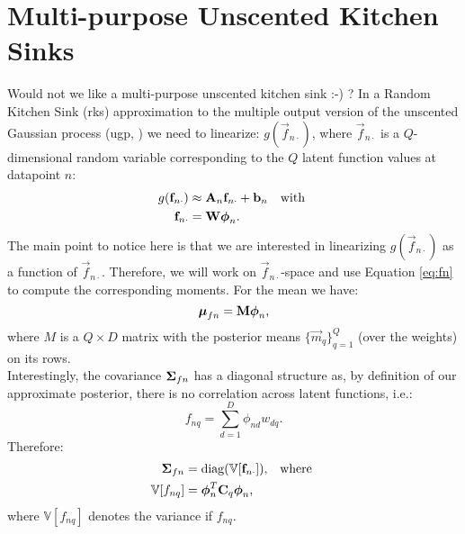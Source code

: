 \documentclass[11pt,a4paper]{article}
\newcommand{\rks}{{\sc rks}\xspace}
\newcommand{\ugp}{{\sc ugp}\xspace}
\newcommand{\m}{\vec{m}}
\renewcommand{\Q}{Q}
\newcommand{\f}{\vec{f}}
\newcommand{\fn}{\f_{n \cdot}}
\newcommand{\An}{\mat{A}_n}
\newcommand{\bn}{\vec{b}_n}
\renewcommand{\W}{\mat{W}}
\newcommand{\phin}{\vecS{\phi}_n}
\newcommand{\mufn}{\vecS{\mu}_{fn}}
\newcommand{\Sigmafn}{\mat{\Sigma}_{fn}}
\newcommand{\M}{\mat{M}}
\renewcommand{\D}{D}
\newcommand{\fnq}{f_{nq}}
\newcommand{\var}[1]{\mathbb{V}[#1]}
\begin{document}
%
\section{Multi-purpose Unscented Kitchen Sinks}
Would not we like a multi-purpose unscented kitchen sink :-) ? In a Random Kitchen Sink (\rks)
approximation to the multiple output version of the unscented Gaussian process (\ugp, ) we need to linearize: $g(\fn)$, where $\fn$ is a $\Q$-dimensional random variable corresponding to the $\Q$ latent function values at datapoint $n$:
\begin{align}
	g(\fn) & \approx \An \fn + \bn \quad \text{with }\\
	\label{eq:fn}
\fn &=  \W \phin \text{.}
\end{align}
The main point to notice here is that we are interested in linearizing $g(\fn)$ as a function of $\fn$. 
Therefore, we will work on $\fn$-space and use Equation \eqref{eq:fn} to compute the corresponding
moments. For the mean we have:
\begin{equation}
	\mufn = \M \phin \text{,}
\end{equation}
where $M$ is a $\Q \times \D$  matrix with the posterior means $\{ \m_q\}_{q=1}^{Q}$ (over 
the weights) on its rows. \\

Interestingly, the covariance $\Sigmafn$ has a diagonal structure as, by definition of our 
approximate posterior, there is no correlation across latent functions, i.e.:
\begin{equation}
	\fnq = \sum_{d=1}^{\D} \phi_{nd} w_{dq} \text{.}
\end{equation}
Therefore:
\begin{align}
	\label{eq:Sigmafn}
	\Sigmafn &= \diag(\var{\fn}) \text{,} \quad \text{where } \\
	\label{eq:var-fnq}
	\var{\fnq} & =  \phin^T  \C_q \phin  \text{,}
\end{align}
where $\var{\fnq}$ denotes the variance if $\fnq$. \\
\end{document}
